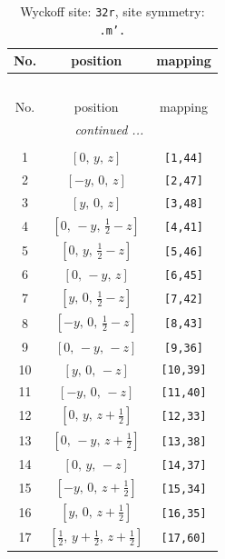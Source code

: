 \documentclass[fleqn,8pt]{jsarticle}
\begin{document}
\begin{longtable}{ccc}
\caption{Wyckoff site: {\tt 32r}, site symmetry: {\tt .m'.}}
 \\
 \hline \hline
No. & position & mapping \\ \hline \endfirsthead

\multicolumn{2}{l}{\tablename\ \thetable{}} \\
 \hline \hline
No. & position & mapping \\ \hline \endhead

 \hline \hline
\multicolumn{2}{r}{\footnotesize\it continued ...} \\ \endfoot

 \hline \hline
\multicolumn{2}{r}{} \\ \endlastfoot

1 & $\left[ 0,\, y,\, z \right]$ & {\tt [1,44]} \\ \hline
2 & $\left[ - y,\, 0,\, z \right]$ & {\tt [2,47]} \\ \hline
3 & $\left[ y,\, 0,\, z \right]$ & {\tt [3,48]} \\ \hline
4 & $\left[ 0,\, - y,\, \frac{1}{2} - z \right]$ & {\tt [4,41]} \\ \hline
5 & $\left[ 0,\, y,\, \frac{1}{2} - z \right]$ & {\tt [5,46]} \\ \hline
6 & $\left[ 0,\, - y,\, z \right]$ & {\tt [6,45]} \\ \hline
7 & $\left[ y,\, 0,\, \frac{1}{2} - z \right]$ & {\tt [7,42]} \\ \hline
8 & $\left[ - y,\, 0,\, \frac{1}{2} - z \right]$ & {\tt [8,43]} \\ \hline
9 & $\left[ 0,\, - y,\, - z \right]$ & {\tt [9,36]} \\ \hline
10 & $\left[ y,\, 0,\, - z \right]$ & {\tt [10,39]} \\ \hline
11 & $\left[ - y,\, 0,\, - z \right]$ & {\tt [11,40]} \\ \hline
12 & $\left[ 0,\, y,\, z + \frac{1}{2} \right]$ & {\tt [12,33]} \\ \hline
13 & $\left[ 0,\, - y,\, z + \frac{1}{2} \right]$ & {\tt [13,38]} \\ \hline
14 & $\left[ 0,\, y,\, - z \right]$ & {\tt [14,37]} \\ \hline
15 & $\left[ - y,\, 0,\, z + \frac{1}{2} \right]$ & {\tt [15,34]} \\ \hline
16 & $\left[ y,\, 0,\, z + \frac{1}{2} \right]$ & {\tt [16,35]} \\ \hline
17 & $\left[ \frac{1}{2},\, y + \frac{1}{2},\, z + \frac{1}{2} \right]$ & {\tt [17,60]} \\ \hline

\end{longtable}
\end{document}
